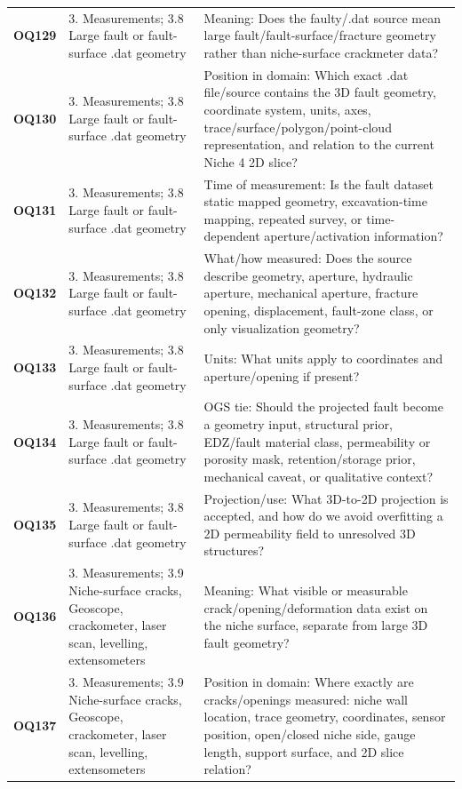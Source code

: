 \begin{longtable}{@{}L{0.10\textwidth} L{0.23\textwidth} L{0.59\textwidth}@{}}
\addlinespace[0.16em]
\textbf{OQ129} & 3. Measurements; 3.8 Large fault or fault-surface .dat geometry & Meaning: Does the faulty/.dat source mean large fault/fault-surface/fracture geometry rather than niche-surface crackmeter data?\\
\addlinespace[0.16em]
\textbf{OQ130} & 3. Measurements; 3.8 Large fault or fault-surface .dat geometry & Position in domain: Which exact .dat file/source contains the 3D fault geometry, coordinate system, units, axes, trace/surface/polygon/point-cloud representation, and relation to the current Niche 4 2D slice?\\
\addlinespace[0.16em]
\textbf{OQ131} & 3. Measurements; 3.8 Large fault or fault-surface .dat geometry & Time of measurement: Is the fault dataset static mapped geometry, excavation-time mapping, repeated survey, or time-dependent aperture/activation information?\\
\addlinespace[0.16em]
\textbf{OQ132} & 3. Measurements; 3.8 Large fault or fault-surface .dat geometry & What/how measured: Does the source describe geometry, aperture, hydraulic aperture, mechanical aperture, fracture opening, displacement, fault-zone class, or only visualization geometry?\\
\addlinespace[0.16em]
\textbf{OQ133} & 3. Measurements; 3.8 Large fault or fault-surface .dat geometry & Units: What units apply to coordinates and aperture/opening if present?\\
\addlinespace[0.16em]
\textbf{OQ134} & 3. Measurements; 3.8 Large fault or fault-surface .dat geometry & OGS tie: Should the projected fault become a geometry input, structural prior, EDZ/fault material class, permeability or porosity mask, retention/storage prior, mechanical caveat, or qualitative context?\\
\addlinespace[0.16em]
\textbf{OQ135} & 3. Measurements; 3.8 Large fault or fault-surface .dat geometry & Projection/use: What 3D-to-2D projection is accepted, and how do we avoid overfitting a 2D permeability field to unresolved 3D structures?\\
\addlinespace[0.16em]
\textbf{OQ136} & 3. Measurements; 3.9 Niche-surface cracks, Geoscope, crackometer, laser scan, levelling, extensometers & Meaning: What visible or measurable crack/opening/deformation data exist on the niche surface, separate from large 3D fault geometry?\\
\addlinespace[0.16em]
\textbf{OQ137} & 3. Measurements; 3.9 Niche-surface cracks, Geoscope, crackometer, laser scan, levelling, extensometers & Position in domain: Where exactly are cracks/openings measured: niche wall location, trace geometry, coordinates, sensor position, open/closed niche side, gauge length, support surface, and 2D slice relation?\\

\end{longtable}
